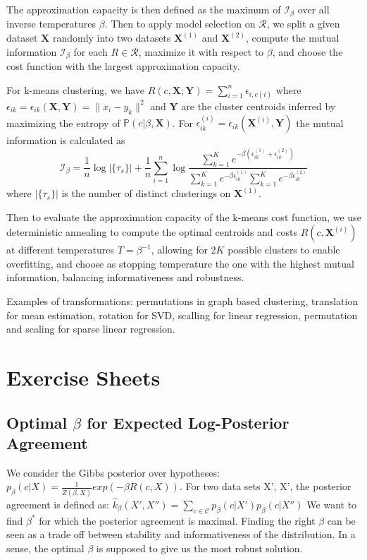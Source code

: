 \documentclass[9pt,parskip]{scrartcl}
\begin{document}
\begin{multicols*}{4}
The approximation capacity is then defined as the maximum of $\mathcal{I}_\beta$ over all inverse temperatures $\beta$. Then to apply model selection on $\mathcal{R}$, we split a given dataset $\mathbf{X}$ randomly into two datasets $\mathbf{X}^{(1)}$ and $\mathbf{X}^{(2)}$, compute the mutual information $\mathcal{I}_\beta$ for each $R \in \mathcal{R}$, maximize it with respect to $\beta$, and choose the cost function with the largest approximation capacity.

For k-means clustering, we have $R(c, \mathbf{X}; \mathbf{Y}) = \sum_{i=1}^n \epsilon_{i,c(i)}$ where $\epsilon_{ik} = \epsilon_{ik}(\mathbf{X}, \mathbf{Y}) = \|x_i - y_k\|^2$ and $\mathbf{Y}$ are the cluster centroids inferred by maximizing the entropy of $\mathbb{P}(c|\beta, \mathbf{X})$. For $\epsilon^{(i)}_{ik} = \epsilon_{ik}(\mathbf{X}^{(i)}, \mathbf{Y})$ the mutual information is calculated as
$$\mathcal{I}_\beta = \frac{1}{n} \log |\{\tau_s\}| + \frac{1}{n} \sum_{i=1}^n \log \frac{\sum_{k=1}^K e^{-\beta(\epsilon^{(1)}_{ik}+\epsilon^{(2)}_{ik})}}{\sum_{k=1}^K e^{-\beta\epsilon^{(1)}_{ik}} \sum_{k=1}^K e^{-\beta\epsilon^{(2)}_{ik}}}$$
where $|\{\tau_s\}|$ is the number of distinct clusterings on $\mathbf{X}^{(1)}$. 

Then to evaluate the approximation capacity of the k-means cost function, we use deterministic annealing to compute the optimal centroids and costs $R(c, \mathbf{X}^{(i)})$ at different temperatures $T = \beta^{-1}$, allowing for $2K$ possible clusters to enable overfitting, and choose as stopping temperature the one with the highest mutual information, balancing informativeness and robustness.

Examples of transformations: permutations in graph based clustering, translation for mean estimation, rotation for SVD, scalling for linear regression, permutation and scaling for sparse linear regression. 

\section*{Exercise Sheets}
\subsection*{Optimal $\beta$ for Expected Log-Posterior Agreement}

We consider the Gibbs posterior over hypotheses:
$p_{\beta}(c|X) = \frac{1}{Z(\beta, X)}exp(-\beta R(c,X))$.
For two data sets X', X', the posterior agreement is defined as: 
$\hat k_{\beta}(X',X'') = \sum_{c \in \mathcal{C}}p_{\beta}(c|X')p_{\beta}(c|X'')$
We want to find $\beta^*$ for which the posterior agreement is maximal. Finding the right $\beta$ can be seen as a trade off between stability and informativeness of the distribution. 
In a sense, the optimal $\beta$ is supposed to give us the most robust solution.


\end{multicols*}
\end{document}
